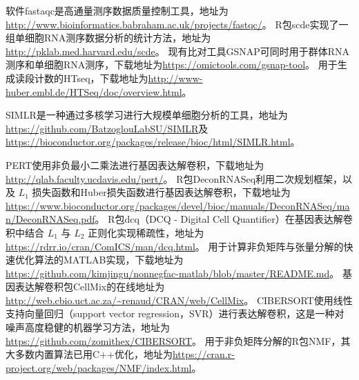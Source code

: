 软件fastaqc是高通量测序数据质量控制工具，地址为\url{http://www.bioinformatics.babraham.ac.uk/projects/fastqc/}。
R包scde实现了一组单细胞RNA测序数据分析的统计方法，地址为\url{http://pklab.med.harvard.edu/scde}。
现有比对工具GSNAP可同时用于群体RNA测序和单细胞RNA测序，下载地址为\url{https://omictools.com/gsnap-tool}。
用于生成读段计数的HTseq，下载地址为\url{http://www-huber.embl.de/HTSeq/doc/overview.html}。

SIMLR是一种通过多核学习进行大规模单细胞分析的工具，地址为
\url{https://github.com/BatzoglouLabSU/SIMLR}及
\url{https://bioconductor.org/packages/release/bioc/html/SIMLR.html}。

PERT使用非负最小二乘法进行基因表达解卷积，下载地址为\url{http://qlab.faculty.ucdavis.edu/pert/}。
R包DeconRNASeq利用二次规划框架，以及 $L_1$ 损失函数和Huber损失函数进行基因表达解卷积，下载地址为\url{https://www.bioconductor.org/packages/devel/bioc/manuals/DeconRNASeq/man/DeconRNASeq.pdf}。
R包dcq（DCQ - Digital Cell Quantifier）在基因表达解卷积中结合 $L_1$ 与 $L_2$ 正则化实现稀疏性，地址为\url{https://rdrr.io/cran/ComICS/man/dcq.html}。
用于计算非负矩阵与张量分解的快速优化算法的MATLAB实现，下载地址为\url{https://github.com/kimjingu/nonnegfac-matlab/blob/master/README.md}。
基因表达解卷积包CellMix的在线地址为\url{http://web.cbio.uct.ac.za/~renaud/CRAN/web/CellMix}。
CIBERSORT使用线性支持向量回归（support vector regression，SVR）进行表达解卷积，这是一种对噪声高度稳健的机器学习方法，地址为\url{https://github.com/zomithex/CIBERSORT}。
用于非负矩阵分解的R包NMF，其大多数内置算法已用C++优化，地址为\url{https://cran.r-project.org/web/packages/NMF/index.html}。
\endgroup
